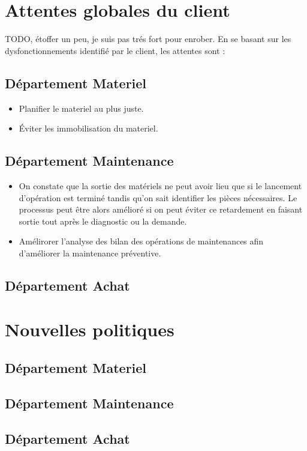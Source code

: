 \section{Attentes globales du client}
    {\huge TODO, étoffer un peu, je suis pas trés fort pour enrober.}
    En se basant sur les dysfonctionnements identifié par le client, les attentes sont :
    \subsection{Département Materiel}
        \begin{itemize}
            \item Planifier le materiel au plus juste.
            \item \'Eviter les immobilisation du materiel.
        \end{itemize}
            
    \subsection{Département Maintenance}
        \begin{itemize}
            \item On constate que la sortie des matériels ne peut avoir lieu que si le lancement d’opération est terminé tandis qu’on sait identifier les pièces nécessaires. Le processus peut être alors amélioré si on peut éviter ce retardement en faisant sortie tout après le diagnostic ou la demande.
            \item Amélirorer l'analyse des bilan des opérations de maintenances afin d'améliorer la maintenance préventive.
        \end{itemize}
    \subsection{Département Achat}
        
\section{Nouvelles politiques}

    \subsection{Département Materiel}

    \subsection{Département Maintenance}

    \subsection{Département Achat}
